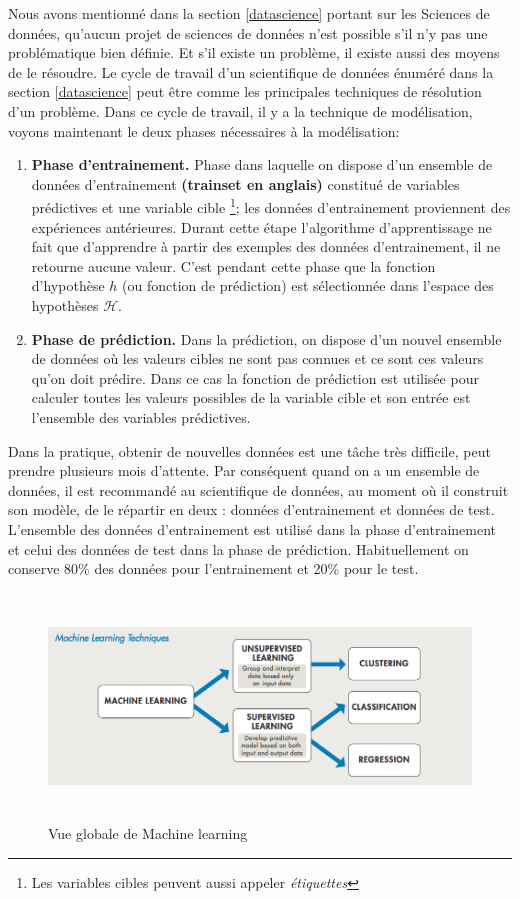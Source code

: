 \documentclass[12pt, french]{report}
\begin{document}
Nous avons mentionné dans la section \ref{datascience} portant sur les Sciences de données, qu'aucun projet de sciences de données n'est possible s'il n'y pas une problématique bien définie. Et s'il existe un problème, il existe aussi des moyens de le résoudre. Le cycle de travail d'un scientifique de données énuméré dans la section \ref{datascience} peut être comme les principales techniques de résolution d'un problème. Dans ce cycle de travail, il y a la technique de modélisation, voyons maintenant le deux phases nécessaires à la modélisation:
\begin{enumerate}
	\item \textbf{Phase d'entrainement.} Phase dans laquelle on dispose d'un ensemble de données d'entrainement \textbf{(trainset en anglais)} constitué de variables prédictives et une variable cible \footnote{Les variables cibles peuvent aussi appeler \textit{étiquettes}}; les données d'entrainement proviennent des expériences antérieures. Durant cette étape l'algorithme d'apprentissage ne fait que d'apprendre à partir des exemples des données d'entrainement, il ne retourne aucune valeur. C'est pendant cette phase que la fonction d'hypothèse $h$ (ou fonction de prédiction) est sélectionnée dans l'espace des hypothèses $\mathcal{H}$. 
	\item \textbf{Phase de prédiction.} Dans la prédiction, on dispose d'un nouvel ensemble de données où les valeurs cibles ne sont pas connues et ce sont ces valeurs qu'on doit prédire. Dans ce cas la fonction de prédiction est utilisée pour calculer toutes les valeurs possibles de la variable cible et son entrée est l'ensemble des variables prédictives.
\end{enumerate}

Dans la pratique, obtenir de nouvelles données est une tâche très difficile,  peut prendre plusieurs mois d'attente. Par conséquent quand on a un ensemble de données, il est recommandé au scientifique de données, au moment où il construit son modèle, de le répartir en deux : données d'entrainement et données de test. L'ensemble des données d'entrainement est utilisé dans la phase d'entrainement et celui des données de test dans la phase de prédiction.  Habituellement on conserve 80\% des données pour l'entrainement et 20\% pour le test. 

\begin{figure}[h]
\includegraphics[width=15cm, height=6cm]{images/machinelearning.png}
\caption{Vue globale de Machine learning \cite{key24}}
\label{machinelearning}
\end{figure}
\end{document}

